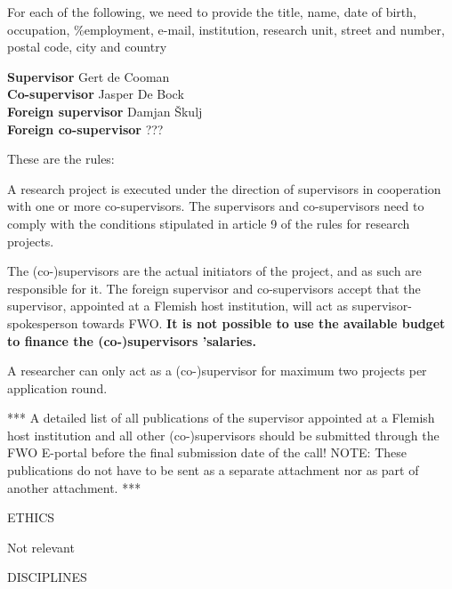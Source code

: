 \documentclass[11pt,dvipsnames,usenames,a4paper]{article}
\begin{document}
For each of the following, we need to provide the title, name, date of birth, occupation, \%employment, e-mail, institution, research unit, street and number, postal code, city and country

\textbf{Supervisor} \tab Gert de Cooman\\
\textbf{Co-supervisor} \tab Jasper De Bock\\
\textbf{Foreign supervisor} \tab Damjan {\v S}kulj\\
\textbf{Foreign co-supervisor} \tab ???\\

\vspace{5pt}

{\color{Gray}
These are the rules:

A research project is executed under the direction of supervisors in cooperation with one or more co-supervisors. The supervisors and co-supervisors need to comply with the conditions stipulated in article 9 of the rules for research projects.

The (co-)supervisors are the actual initiators of the project, and as such are responsible for it. The foreign supervisor and co-supervisors accept that the supervisor, appointed at a Flemish host institution, will act as supervisor-spokesperson towards FWO. {\bf It is not possible to use the available budget to finance the (co-)supervisors ’salaries.}

A researcher can only act as a (co-)supervisor for maximum two projects per application round.
}

*** A detailed list of all publications of the supervisor appointed at a Flemish host institution and all other (co-)supervisors should be submitted through the FWO E-portal before the final submission date of the call!
NOTE: These publications do not have to be sent as a separate attachment nor as part of another attachment. ***

\vspace{5mm}

\begin{shaded}\centering ETHICS \end{shaded}

Not relevant

\vspace{5mm}

\begin{shaded}\centering DISCIPLINES \end{shaded}
\end{document}
